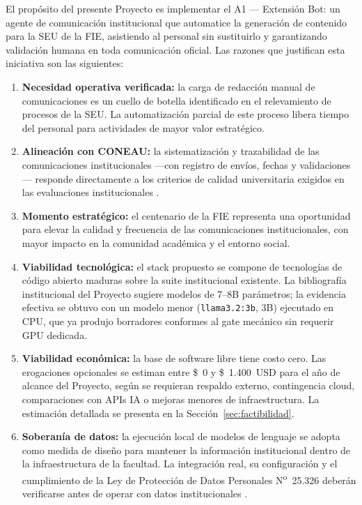 \documentclass[a4paper, 12pt]{article}
\begin{document}
El prop\'osito del presente Proyecto es implementar el \ac{A1} --- Extensi\'on Bot: un agente de comunicaci\'on institucional que automatice la generaci\'on de contenido para la \ac{SEU} de la \ac{FIE}, asistiendo al personal sin sustituirlo y garantizando validaci\'on humana en toda comunicaci\'on oficial. Las razones que justifican esta iniciativa son las siguientes:

\begin{enumerate}[label=\arabic*.]
  \item \textbf{Necesidad operativa verificada:} la carga de redacci\'on manual de comunicaciones es un cuello de botella identificado en el relevamiento de procesos de la \ac{SEU}. La automatizaci\'on parcial de este proceso libera tiempo del personal para actividades de mayor valor estrat\'egico.

  \item \textbf{Alineaci\'on con CONEAU:} la sistematizaci\'on y trazabilidad de las comunicaciones institucionales ---con registro de env\'ios, fechas y validaciones--- responde directamente a los criterios de calidad universitaria exigidos en las evaluaciones institucionales \parencite{coneau2020}.

  \item \textbf{Momento estrat\'egico:} el centenario de la \ac{FIE} representa una oportunidad para elevar la calidad y frecuencia de las comunicaciones institucionales, con mayor impacto en la comunidad acad\'emica y el entorno social.

  \item \textbf{Viabilidad tecnol\'ogica:} el stack propuesto se compone de tecnolog\'ias de c\'odigo abierto maduras sobre la suite institucional existente. La bibliograf\'ia institucional del Proyecto sugiere modelos de 7--8B par\'ametros; la evidencia efectiva se obtuvo con un modelo menor (\texttt{llama3.2:3b}, 3B) ejecutado en CPU, que ya produjo borradores conformes al gate mec\'anico sin requerir GPU dedicada.

  \item \textbf{Viabilidad econ\'omica:} la base de software libre tiene costo cero. Las erogaciones opcionales se estiman entre \$~0 y \$~1.400~USD para el a\~no de alcance del Proyecto, seg\'un se requieran respaldo externo, contingencia cloud, comparaciones con APIs IA o mejoras menores de infraestructura. La estimaci\'on detallada se presenta en la Secci\'on~\ref{sec:factibilidad}.

  \item \textbf{Soberan\'ia de datos:} la ejecuci\'on local de modelos de lenguaje se adopta como medida de dise\~no para mantener la informaci\'on institucional dentro de la infraestructura de la facultad. La integraci\'on real, su configuraci\'on y el cumplimiento de la Ley de Protecci\'on de Datos Personales N\textsuperscript{o}~25.326 deber\'an verificarse antes de operar con datos institucionales \parencite{ley25326}.


\end{enumerate}
\end{document}

